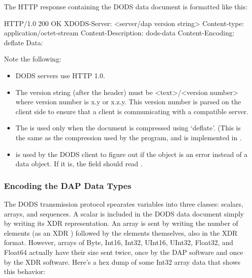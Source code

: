 The HTTP response containing the DODS data document is formatted like
this: 

\begin{example}
HTTP/1.0 200 OK
XDODS-Server: <server/dap version string>
Content-type: application/octet-stream
Content-Description: dods-data
Content-Encoding: deflate
Data:
\end{example}

Note the following:

\begin{itemize}
\item DODS servers use HTTP 1.0.
  
\item The version string (after the  header) must
  be <text>/<version number> where version number is x.y or x.z.y.
  This version number is parsed on the client side to ensure that a
  client is communicating with a compatible server.
  
\item The  is used only when the document is
  compressed using `deflate'.  (This is the same as the compression
  used by the  program, and is implemented in . 
  
\item {} is used by the DODS client to figure
  out if the object is an error instead of a data object.  If it is,
  the  field should read .

\end{itemize}

\subsubsection{Encoding the DAP Data Types}
\label{pguide,server-spec,data-doc}

The DODS transmission protocol spearates variables into three classes:
scalars, arrays, and sequences.  A scalar is included in the DODS data
document simply by writing its XDR representation. An array is sent by
writing the number of elements (as an XDR ) followed by the
elements themselves, also in the XDR format.  However, arrays of Byte,
Int16, Int32, UInt16, UInt32, Float32, and Float64 actually have their
size sent twice, once by the DAP software and once by the XDR
software. Here's a hex dump of some Int32 array data that shows this
behavior:

